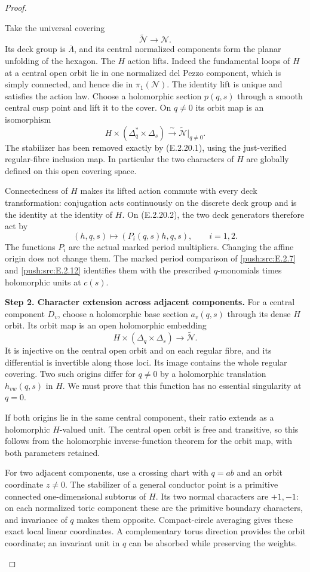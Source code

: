 \begin{proof}
\begin{enumerate}[label={$\langle1\rangle$\arabic*.},leftmargin=*]
Take the universal covering
\[
 \widetilde{\mathcal N}\longrightarrow\mathcal N.
\]
Its deck group is
$\overline\Lambda$, and its
central normalized components
form the planar unfolding of
the hexagon.  The $H$ action
lifts.  Indeed the fundamental
loops of $H$ at a central open
orbit lie in one normalized
del Pezzo component, which is
simply connected, and hence die
in $\pi_1(\mathcal N)$.
The identity lift is unique
and satisfies the action law.
Choose a holomorphic section
$p(q,s)$ through a smooth
central cusp point and lift
it to the cover.  On $q\ne0$
its orbit map is an isomorphism
\[
 H\times(\Delta_q^*\times\Delta_s)
       \xrightarrow{\ \sim\ }
 \widetilde{\mathcal N}|_{q\ne0}.
 \tag{E.2.20.2}
\]
The stabilizer has been removed
exactly by (E.2.20.1), using
the just-verified regular-fibre
inclusion map.  In particular
the two characters of $H$
are globally defined on this
open covering space.

Connectedness of $H$ makes
its lifted action commute
with every deck transformation:
conjugation acts continuously
on the discrete deck group
and is the identity at the
identity of $H$.  On
(E.2.20.2), the two deck
generators therefore act by
\[
 (h,q,s)\longmapsto(P_i(q,s)h,q,s),
 \qquad i=1,2.
 \tag{E.2.20.3}
\]
The functions $P_i$ are the
actual marked period multipliers.
Changing the affine origin
does not change them.
The marked period comparison
of \ref{push:src:E.2.7} and \ref{push:src:E.2.12} identifies
them with the prescribed
$q$-monomials times holomorphic
units at $c(s)$.

\noindent\textbf{Step 2. Character extension across adjacent components.}
For a central component $D_v$,
choose a holomorphic base
section $a_v(q,s)$ through
its dense $H$ orbit.  Its
orbit map is an open
holomorphic embedding
\[
 H\times(\Delta_q\times\Delta_s)
       \longrightarrow\widetilde{\mathcal N}.
\]
It is injective on the
central open orbit and on
each regular fibre, and
its differential is invertible
along those loci.  Its
image contains the whole
regular covering.  Two
such origins differ for
$q\ne0$ by a holomorphic
translation $h_{vw}(q,s)$
in $H$.  We must prove
that this function has no
essential singularity at
$q=0$.

If both origins lie in
the same central component,
their ratio extends as a
holomorphic $H$-valued
unit.  The central open
orbit is free and transitive,
so this follows from the
holomorphic inverse-function
theorem for the orbit map,
with both parameters retained.

For two adjacent components,
use a crossing chart with
$q=ab$ and an orbit coordinate
$z\ne0$.  The stabilizer
of a general conductor
point is a primitive
connected one-dimensional
subtorus of $H$.  Its
two normal characters are
$+1,-1$: on each normalized
toric component these are
the primitive boundary
characters, and invariance
of $q$ makes them opposite.
Compact-circle averaging
gives these exact local
linear coordinates.  A
complementary torus direction
provides the orbit coordinate;
an invariant unit in $q$
can be absorbed while
preserving the weights.


\end{enumerate}
\end{proof}

